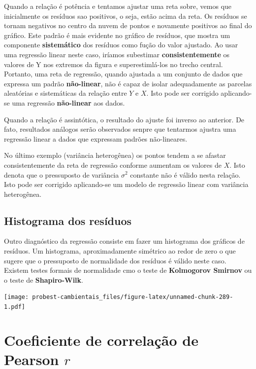 \documentclass[
]{book}
\begin{document}
Quando a relação é potência e tentamos ajustar uma reta sobre, vemos que inicialmente os resíduos sao positivos, o seja, estão acima da reta. Os resíduos se tornam negativos no centro da nuvem de pontos e novamente positivos ao final do gráfico. Este padrão é mais evidente no gráfico de resíduos, que mostra um componente \textbf{sistemático} dos resíduos como fução do valor ajustado. Ao usar uma regressão linear neste caso, iríamos subestimar \textbf{consistentemente} os valores de Y nos extremos da figura e superestimlá-los no trecho central. Portanto, uma reta de regressão, quando ajustada a um conjunto de dados que expressa um padrão \textbf{não-linear}, não é capaz de isolar adequadamente as parcelas aleatórias e sistemáticas da relação entre \(Y\) e \(X\). Isto pode ser corrigido aplicando-se uma regressão \textbf{não-linear} aos dados.

Quando a relação é assintótica, o resultado do ajuste foi inverso ao anterior. De fato, resultados análogos serão observados senpre que tentarmos ajustra uma regressão linear a dados que expressam padrões não-lineares.

No último exemplo (variância heterogênea) os pontos tendem a se afastar consistentemente da reta de regressão conforme aumentam os valores de \(X\). Isto denota que o pressuposto de variância \(\sigma^2\) constante não é válido nesta relação. Isto pode ser corrigido aplicando-se um modelo de regressão linear com variância heterogênea.

\hypertarget{histograma-dos-resuxedduos}{%
\subsection{Histograma dos resíduos}\label{histograma-dos-resuxedduos}}

Outro diagnóstico da regressão consiste em fazer um histograma dos gráficos de resíduos. Um histograma, aproximadamente simétrico ao redor de zero o que sugere que o pressuposto de normalidade dos resíduos é válido neste caso. Existem testes formais de normalidade cmo o teste de \textbf{Kolmogorov Smirnov} ou o teste de \textbf{Shapiro-Wilk}.

\texttt{[image: probest-cambientais\_files/figure-latex/unnamed-chunk-289-1.pdf]}

\hypertarget{coeficiente-de-correlauxe7uxe3o-de-pearson-r}{%
\section{\texorpdfstring{Coeficiente de correlação de Pearson \(r\)}{Coeficiente de correlação de Pearson r}}\label{coeficiente-de-correlauxe7uxe3o-de-pearson-r}}
\end{document}
